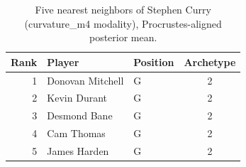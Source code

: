 \begin{table}[htbp]
  \centering\small
  \begin{tabular}{rllc}
    \toprule
    Rank & Player & Position & Archetype \\
    \midrule
    1 & Donovan Mitchell & G & 2 \\
    2 & Kevin Durant & G & 2 \\
    3 & Desmond Bane & G & 2 \\
    4 & Cam Thomas & G & 2 \\
    5 & James Harden & G & 2 \\
    \bottomrule
  \end{tabular}
  \caption{Five nearest neighbors of Stephen Curry (curvature_m4 modality), Procrustes-aligned posterior mean.}
  \label{tab:Stephen_Curry_neighbors_curvature_m4}
\end{table}

